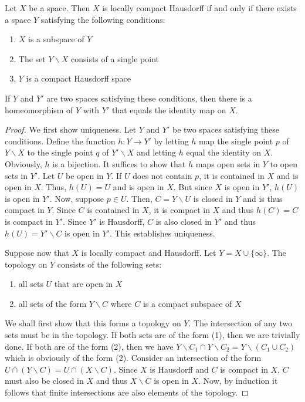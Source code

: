 \begin{theorem}
    Let $X$ be a space. Then $X$ is locally compact Hausdorff if and only if there exists a space $Y$ satisfying the following conditions:
    \begin{enumerate}
        \item $X$ is a subspace of $Y$ 
        \item The set $Y\backslash X$ consists of a single point 
        \item $Y$ is a compact Hausdorff space
    \end{enumerate}
    If $Y$ and $Y'$ are two spaces satisfying these conditions, then there is a homeomorphism of $Y$ with $Y'$ that equals the identity map on $X$.
\end{theorem}
\begin{proof}
    We first show uniqueness. Let $Y$ and $Y'$ be two spaces satisfying these conditions. Define the function $h:Y\to Y'$ by letting $h$ map the single point $p$ of $Y\backslash X$ to the single point $q$ of $Y'\backslash X$ and letting $h$ equal the identity on $X$. Obviously, $h$ is a bijection. It suffices to show that $h$ maps open sets in $Y$ to open sets in $Y'$. Let $U$ be open in $Y$. If $U$ does not contain $p$, it is contained in $X$ and is open in $X$. Thus, $h(U) = U$ and is open in $X$. But since $X$ is open in $Y'$, $h(U)$ is open in $Y'$. Now, suppose $p\in U$. Then, $C = Y\backslash U$ is closed in $Y$ and is thus compact in $Y$. Since $C$ is contained in $X$, it is compact in $X$ and thus $h(C) = C$ is compact in $Y'$. Since $Y'$ is Hausdorff, $C$ is also closed in $Y'$ and thus $h(U) = Y'\backslash C$ is open in $Y'$. This establishes uniqueness.

    Suppose now that $X$ is locally compact and Hausdorff. Let $Y = X\cup\{\infty\}$. The topology on $Y$ consists of the following sets:
    \begin{enumerate}
        \item all sets $U$ that are open in $X$
        \item all sets of the form $Y\backslash C$ where $C$ is a compact subspace of $X$
    \end{enumerate}
    We shall first show that this forms a topology on $Y$. The intersection of any two sets must be in the topology. If both sets are of the form (1), then we are trivially done. If both are of the form (2), then we have $Y\backslash C_1\cap Y\backslash C_2 = Y\backslash(C_1\cup C_2)$ which is obviously of the form (2). Consider an intersection of the form $U\cap(Y\backslash C) = U\cap(X\backslash C)$. Since $X$ is Hausdorff and $C$ is compact in $X$, $C$ must also be closed in $X$ and thus $X\backslash C$ is open in $X$. Now, by induction it follows that finite intersections are also elements of the topology.


\end{proof}
